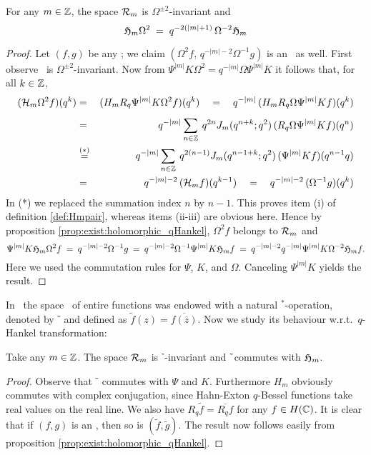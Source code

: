 \begin{prop} \label{prop:holS:Omega_invariant}
For any $m\in \mathbb{Z}$, the space ${\mathcal R}_{m}$ is $\Omega^{\pm 2}$-invariant and
\begin{equation}\label{eq:holS:Omega_invariant}
  \mathfrak{H}_{m} \Omega^2 \;=\; q^{-2(|m|+1)}\, \Omega^{-2} \mathfrak{H}_{m}
\end{equation}
\end{prop}
\begin{proof}
Let $(f,g)$ be any \Hmpair\@; we claim
$(\Omega^2 f,\, q^{-|m|-2}\Omega^{-1} g)$ is an \Hmpair\ as well.
First observe \Swqbis\ is $\Omega^{\pm 2}$-invariant.
Now from $\Psi^{|m|} K \Omega^2 = q^{-|m|} \Omega \Psi^{|m|} K$
it follows that, for all $k\in \mathbb{Z}$,
\begin{eqnarray*}
(\auxH{m} \Omega^2 f)(q^k)
  &=& (H_m R_q \Psi^{|m|} K \Omega^2 f)(q^k)
  \hspace{1em} = \hspace{1em}
      q^{-|m|}\,(H_m R_q \Omega \Psi^{|m|} K f)(q^k) \\
  \vertXL
  &=& q^{-|m|} \sum_{n\in \ZZ} \: q^{2n} \J{m}{q^{n+k}}\,(R_q \Omega \Psi^{|m|} K f)(q^n)\\
  &\stackrel{(*)}{=}&
      q^{-|m|} \sum_{n\in \ZZ} \: q^{2(n-1)} \J{m}{q^{n-1+k}}\,(\Psi^{|m|} K f)(q^{n-1} q)\\
  &=& q^{-|m|-2} \,(\auxH{m} f)(q^{k-1})
  \hspace{1em} = \hspace{1em}
  q^{-|m|-2}\, (\Omega^{-1} g)(q^k)
\end{eqnarray*}
In (*) we replaced the summation index $n$ by $n-1$.
This proves item (i) of definition \ref{def:Hmpair}, whereas items (ii-iii)
are obvious here. Hence by proposition \ref{prop:exist:holomorphic_qHankel},
$\Omega^2 f$ belongs to ${\mathcal R}_{m}$ and
$$ \Psi^{|m|} K \mathfrak{H}_{m} \Omega^2 f \:=\:  q^{-|m|-2}\Omega^{-1} g
      \: =\:  q^{-|m|-2}\Omega^{-1} \Psi^{|m|} K \mathfrak{H}_{m} f
      \: =\:  q^{-|m|-2} q^{-|m|} \Psi^{|m|} K \Omega^{-2} \mathfrak{H}_{m} f.  $$
Here we used the commutation rules for $\Psi$, $K$, and $\Omega$.
Canceling $\Psi^{|m|} K$ yields the result.
\end{proof}

\vspace{2ex}
In \cite{Jeroen:QE2:haar}\ the space \HC\ of entire functions was
endowed with a natural $^*$-operation, denoted by $\tilde{\:}$ and
defined as $\tilde{f}(z) = \overline{f(\overline{z})}$. Now we study its
behaviour w.r.t.\ $q$-Hankel transformation:

\begin{prop} \label{prop:qHankel:tilde}
Take any $m\in\mathbb{Z}$. The space ${\mathcal R}_{m}$ is $\tilde{\:}$-invariant and\/
$\tilde{\:}\!$ commutes with $\mathfrak{H}_{m}$.
\end{prop}
\begin{proof}
Observe that $\tilde{\:}$ commutes with $\Psi$ and $K$.
Furthermore $H_m$ obviously commutes with complex conjugation,
since Hahn-Exton $q$-Bessel functions take real values on the real line.
We also have $R_q \tilde{f} = \overline{R_q f}$ for any $f\in H(\mathbb{C})$.
It is clear that if $(f,g)$ is an \Hmpair, then so is $(\tilde{f},\tilde{g})$.
The result now follows easily from proposition \ref{prop:exist:holomorphic_qHankel}.
\end{proof}

